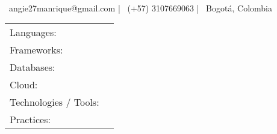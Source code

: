 \documentclass[]{awesome-cv}
\begin{document}
    
\begin{center}
	  \\
	\vspace{2mm}
	{\hspace{0.8cm}\faEnvelope\ angie27manrique@gmail.com}  |  {\faMobile\ (+57) 3107669063}  |  {\faMapMarker\ Bogotá, Colombia} 
\end{center}
\vspace{-2mm}

\begin{cventries}
	\vspace{-2mm}
	\cventry
	{}
	{\def\arraystretch{1.15}{\begin{tabular}{ l l }
		Languages:  & {\skill{ Java, C\#, TypeScript, SQL, Python.}} \\
		Frameworks:  & {\skill{ Spring, Angular.}} \\
		Databases:  & {\skill{ PostgreSQL, MySQL, SQLServer, MongoDB.}} \\
		Cloud:  & {\skill{ AWS, Azure.}} \\
		Technologies / Tools: \hspace{0.05cm} & {\skill{ Docker, Jenkins, GraphQL, Kafka, SonarQube, Maven, npm, Git.}} \\
		Practices:  & {\skill{ Agile, Scrum, SOLID Principles, Test-Driven Development, Code Reviews.}} \\
		\end{tabular}}}
	{}
	{}
	{}
\end{cventries}
\vspace{-12mm}
\end{document}
